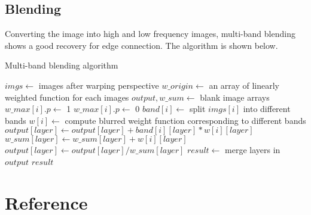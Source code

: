 \documentclass[11pt]{article}
\begin{document}
\subsection{Blending}
Converting the image into high and low frequency images, multi-band blending shows a good recovery for edge connection. The algorithm is shown below.

\begin{algorithm}
\caption{Multi-band blending algorithm}
\begin{algorithmic}
\State $imgs\gets$ images after warping perspective
  \State $w\_origin\gets$ an array of linearly weighted function for each images
  \State $output, w\_sum\gets$ blank image arrays
      \State $w\_max[i].p\gets$ 1
      \Else
      \State $w\_max[i].p\gets$ 0
      \EndIf
    \EndFor
    \State $band[i]\gets$ split $imgs[i]$ into different bands
    \State $w[i]\gets$ compute blurred weight function corresponding to different bands
  \EndFor
      \State $output[layer]\gets output[layer]+band[i][layer]*w[i][layer]$
      \State $w\_sum[layer]\gets w\_sum[layer]+w[i][layer]$
    \EndFor
    \State $output[layer]\gets output[layer]/w\_sum[layer]$
  \EndFor
  \State $result\gets$ merge layers in $output$
  \State \Return $result$
\EndFunction
\end{algorithmic}
\end{algorithm}


\section{Reference}


\end{document}
